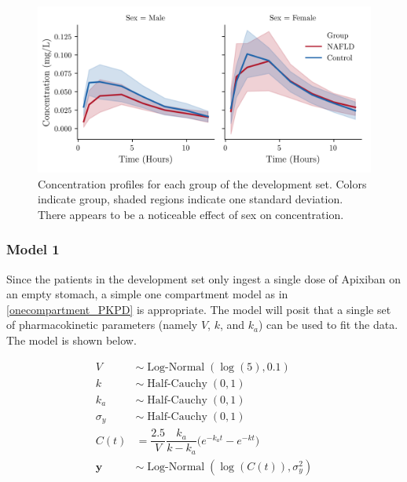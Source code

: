 \begin{figure}[t!]
	\centering
	\includegraphics{Figures/data_summary}
	\caption[Concentration profiles for development set]{Concentration profiles for each group of the development set.  Colors indicate group, shaded regions indicate one standard deviation.  There appears to be a noticeable effect of sex on concentration.}
	\label{datasummary}
\end{figure}

\subsubsection{Model 1}
Since the patients in the development set only ingest a single dose of Apixiban on an empty stomach, a simple one compartment model as in \cref{onecompartment_PKPD} is appropriate.  The model will posit that a single set of pharmacokinetic parameters (namely $V$, $k$, and $k_a$) can be used to fit the data.  The model is shown below.

\begin{align}
	V &\sim \operatorname{Log-Normal}(\log(5),0.1) \label{mod_1_V} \\
	k &\sim \operatorname{Half-Cauchy}(0,1) \label{mod_1_k} \\
	k_a &\sim \operatorname{Half-Cauchy}(0,1) \label{mod_1_ka} \\
	\sigma_y &\sim \operatorname{Half-Cauchy}(0,1) \label{mod_1_sigma} \\
	C(t) &= \dfrac{2.5}{V}\dfrac{k_a}{k - k_a}\Big(e^{-k_at} - e^{-kt}\Big) \label{mod_1_C}\\
	\mathbf{y} &\sim \operatorname{Log-Normal}(\log(C(t)), \sigma_y^2) \label{mod_1_y}
\end{align}

